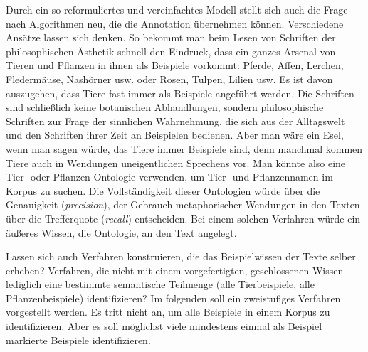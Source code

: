 \documentclass{article}
\newcommand*{\englisch}[1]{\foreignlanguage{english}{\textit{#1}}}%
\renewcommand*{\see}{\autocap{v}gl\adddot}%
\begin{document}
Durch ein so reformuliertes und vereinfachtes Modell stellt sich auch
die Frage nach Algorithmen neu, die die Annotation übernehmen
können. Verschiedene Ansätze lassen sich denken. So bekommt man beim
Lesen von Schriften der philosophischen Ästhetik schnell den Eindruck,
dass ein ganzes Arsenal von Tieren und Pflanzen in ihnen als Beispiele
vorkommt: Pferde, Affen, Lerchen, Fledermäuse, Nashörner usw. oder
Rosen, Tulpen, Lilien usw. Es ist davon auszugehen, dass Tiere fast
immer als Beispiele angeführt werden. Die Schriften sind schließlich
keine botanischen Abhandlungen, sondern philosophische Schriften zur
Frage der sinnlichen Wahrnehmung, die sich aus der Alltagswelt und den
Schriften ihrer Zeit an Beispielen bedienen. Aber man wäre ein Esel,
wenn man sagen würde, das Tiere immer Beispiele sind, denn manchmal
kommen Tiere auch in Wendungen uneigentlichen Sprechens vor. Man
könnte also eine Tier- oder Pflanzen-Ontologie verwenden, um Tier- und
Pflanzennamen im Korpus zu suchen. Die Vollständigkeit dieser
Ontologien würde über die Genauigkeit (\englisch{precision}), der
Gebrauch metaphorischer Wendungen in den Texten über die Trefferquote
(\englisch{recall}) entscheiden. Bei einem solchen Verfahren würde
ein äußeres Wissen, die Ontologie, an den Text angelegt.

Lassen sich auch Verfahren konstruieren, die das Beispielwissen der
Texte selber erheben? Verfahren, die nicht mit einem vorgefertigten,
geschlossenen Wissen lediglich eine bestimmte semantische Teilmenge
(alle Tierbeispiele, alle Pflanzenbeispiele) identifizieren? Im
folgenden soll ein zweistufiges Verfahren vorgestellt
werden. \Parencite[\see\ jetzt auch][]{CL2019d} Es tritt nicht an, um
alle Beispiele in einem Korpus zu identifizieren. Aber es soll
möglichst viele mindestens einmal als Beispiel markierte Beispiele
identifizieren.
\end{document}
